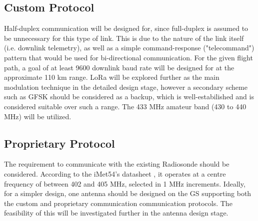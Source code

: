 \subsection{Custom Protocol}
Half-duplex communication will be designed for, since full-duplex is assumed to be unnecessary for this type of link. This is due to the nature of the link itself (i.e. downlink telemetry), as well as a simple command-response ("telecommand") pattern that would be used for bi-directional communication. For the given flight path, a goal of at least 9600 downlink baud rate will be designed for at the approximate 110 km range. LoRa will be explored further as the main modulation technique in the detailed design stage, however a secondary scheme such as GFSK should be considered as a backup, which is well-estabilished and is considered suitable over such a range. The 433 MHz amateur band (430 to 440 MHz) will be utilized.

\subsection{Proprietary Protocol}
The requirement to communicate with the existing Radiosonde should be considered. According to the iMet54's datasheet \cite{datasheet-iMet54}, it operates at a centre frequency of between 402 and 405 MHz, selected in 1 MHz increments. Ideally, for a simpler design, one antenna should be designed on the GS supporting both the custom and proprietary communication communication protocols. The feasibility of this will be investigated further in the antenna design stage.